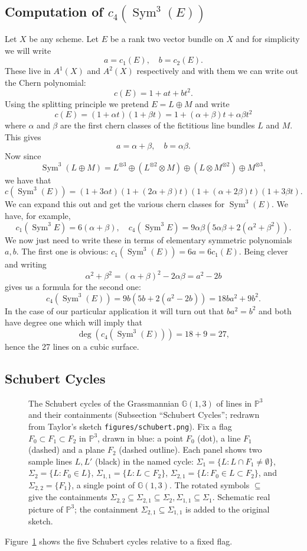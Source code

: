 \documentclass[12pt]{article}
\numberwithin{equation}{section}
\theoremstyle{definition}
\theoremstyle{remark}
\newcommand{\PP}{\mathbb{P}}
\newcommand{\Sym}{\operatorname{Sym}}
\newcommand{\GG}{\mathbb{G}}
\begin{document}
\subsection{Computation of $c_4(\Sym^3(E))$}
Let $X$ be any scheme. 
Let $E$ be a rank two vector bundle on $X$ and for simplicity we will write 
 $$a=c_1(E), \quad b = c_2(E). $$
These live in $A^1(X)$ and $A^2(X)$ respectively and with them we can write out the Chern polynomial:
 $$ c(E) = 1+at+bt^2.$$
Using the splitting principle we pretend $E = L \oplus M$ and write 
 $$ c(E) = (1+\alpha t) (1+\beta t)= 1+(\alpha+\beta)t + \alpha \beta t^2$$
where $\alpha$ and $\beta$ are the first chern classes of the fictitious line bundles $L$ and $M$. 
This gives 
 $$ a = \alpha + \beta, \quad b = \alpha \beta.$$
Now since 
$$\Sym^3(L\oplus M) = L^{\otimes 3} \oplus (L^{\otimes 2} \otimes M) \oplus (L\otimes M^{\otimes 2}) \oplus M^{\otimes 3},$$ 
we have that 
 $$ c(\Sym^3(E)) =(1+3\alpha t) (1+(2\alpha+\beta)t) (1+(\alpha+2\beta)t)(1+3\beta t).$$
We can expand this out and get the various chern classes for $\Sym^3(E)$. 
We have, for example, 
 $$ c_1(\Sym^3 E) = 6(\alpha+\beta), \quad c_4(\Sym^3 E) = 9 \alpha \beta ( 5\alpha\beta + 2(\alpha^2+\beta^2)). $$
We now just need to write these in terms of elementary symmetric polynomials $a,b$.
The first one is obvious: $c_1(\Sym^3(E)) = 6a=6c_1(E)$.
Being clever and writing 
$$\alpha^2+\beta^2 = (\alpha+\beta)^2-2\alpha\beta=a^2-2b$$ 
gives us a formula for the second one:
 $$ c_4(\Sym^3(E)) = 9 b ( 5b + 2(a^2-2b))=18ba^2+9b^2.$$
In the case of our particular application it will turn out that $ba^2 = b^2$ and both have degree one which will imply that 
$$ \deg(c_4(\Sym^3(E))) = 18+9 =27,$$
hence the 27 lines on a cubic surface. 

\subsection{Schubert Cycles}
\begin{figure}[H]
\centering

\caption{The Schubert cycles of the Grassmannian $\GG(1,3)$ of lines in $\PP^3$ and their containments (Subsection ``Schubert Cycles''; redrawn from Taylor's sketch \texttt{figures/schubert.png}). Fix a flag $F_0\subset F_1\subset F_2$ in $\PP^3$, drawn in blue: a point $F_0$ (dot), a line $F_1$ (dashed) and a plane $F_2$ (dashed outline). Each panel shows two sample lines $L,L'$ (black) in the named cycle: $\Sigma_1=\{L: L\cap F_1\neq\emptyset\}$, $\Sigma_2=\{L: F_0\in L\}$, $\Sigma_{1,1}=\{L: L\subset F_2\}$, $\Sigma_{2,1}=\{L: F_0\in L\subset F_2\}$, and $\Sigma_{2,2}=\{F_1\}$, a single point of $\GG(1,3)$. The rotated symbols $\subseteq$ give the containments $\Sigma_{2,2}\subseteq\Sigma_{2,1}\subseteq\Sigma_2,\Sigma_{1,1}\subseteq\Sigma_1$. Schematic real picture of $\PP^3$; the containment $\Sigma_{2,1}\subseteq\Sigma_{1,1}$ is added to the original sketch.}\label{fig:schubert-cycles}
\end{figure}
Figure~\ref{fig:schubert-cycles} shows the five Schubert cycles relative to a fixed flag.
\end{document}
